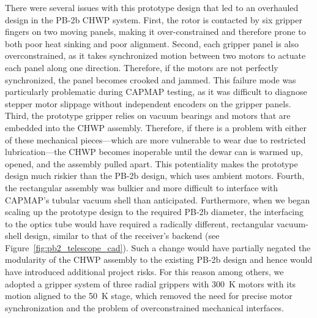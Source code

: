 There were several issues with this prototype design that led to an overhauled design in the PB-2b CHWP system. First, the rotor is contacted by six gripper fingers on two moving panels, making it over-constrained and therefore prone to both poor heat sinking and poor alignment. Second, each gripper panel is also overconstrained, as it takes synchronized motion between two motors to actuate each panel along one direction. Therefore, if the motors are not perfectly synchronized, the panel becomes crooked and jammed. This failure mode was particularly problematic during CAPMAP testing, as it was difficult to diagnose stepper motor slippage without independent encoders on the gripper panels. Third, the prototype gripper relies on vacuum bearings and motors that are embedded into the CHWP assembly. Therefore, if there is a problem with either of these mechanical pieces---which are more vulnerable to wear due to restricted lubrication---the CHWP becomes inoperable until the dewar can is warmed up, opened, and the assembly pulled apart. This potentiality makes the prototype design much riskier than the PB-2b design, which uses ambient motors. Fourth, the rectangular assembly was bulkier and more difficult to interface with CAPMAP's tubular vacuum shell than anticipated. Furthermore, when we began scaling up the prototype design to the required PB-2b diameter, the interfacing to the optics tube would have required a radically different, rectangular vacuum-shell design, similar to that of the receiver's backend (see Figure~\ref{fig:pb2_telescope_cad}). Such a change would have partially negated the modularity of the CHWP assembly to the existing PB-2b design and hence would have introduced additional project risks. For this reason among others, we adopted a gripper system of three radial grippers with 300~K motors with its motion aligned to the 50~K stage, which removed the need for precise motor synchronization and the problem of overconstrained mechanical interfaces.

